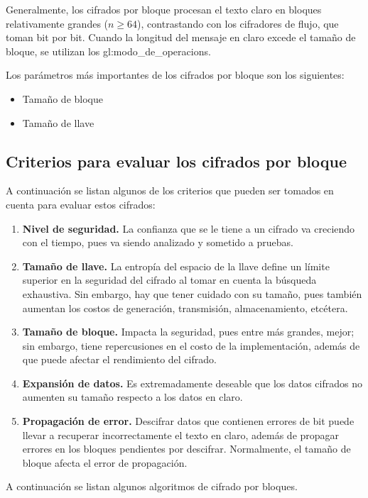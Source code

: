 Generalmente, los cifrados por bloque procesan el texto claro en bloques
relativamente grandes ($n \geq 64$), contrastando con los cifradores de
flujo, que toman bit por bit. Cuando la longitud del mensaje en claro excede
el tamaño de bloque, se utilizan los \glspl{gl:modo_de_operacion}.

Los parámetros más importantes de los cifrados por bloque son los
siguientes:
\begin{itemize}
  \item Tamaño de bloque
  \item Tamaño de llave
\end{itemize}

\subsection{Criterios para evaluar los cifrados por bloque}

A continuación se listan algunos de los criterios que pueden ser tomados
en cuenta para evaluar estos cifrados:
\begin{enumerate}
  \item \textbf{Nivel de seguridad.} La confianza que se le tiene a un
    cifrado va creciendo con el tiempo, pues va siendo analizado y
    sometido a pruebas.
  \item \textbf{Tamaño de llave.} La entropía del espacio de la llave
    define un límite superior en la seguridad del cifrado al tomar en
    cuenta la búsqueda exhaustiva. Sin embargo, hay que tener cuidado
    con su tamaño, pues también aumentan los costos de generación,
    transmisión, almacenamiento, etcétera.
  \item \textbf{Tamaño de bloque.} Impacta la seguridad, pues entre más
    grandes, mejor; sin embargo, tiene repercusiones en el costo de la
    implementación, además de que puede afectar el rendimiento del
    cifrado.
  \item \textbf{Expansión de datos.} Es extremadamente deseable que los
    datos cifrados no aumenten su tamaño respecto a los datos en claro.
  \item \textbf{Propagación de error.} Descifrar datos que contienen
    errores de bit puede llevar a recuperar incorrectamente el texto en
    claro, además de propagar errores en los bloques pendientes por
    descifrar. Normalmente, el tamaño de bloque afecta el error de
    propagación.
\end{enumerate}

A continuación se listan algunos algoritmos de cifrado por bloques.








